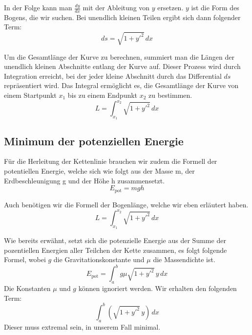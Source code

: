In der Folge kann man \(\frac{dy}{dx}\) mit der Ableitung von \(y\) ersetzen.
\(y\) ist die Form des Bogens, die wir suchen.
Bei unendlich kleinen Teilen ergibt sich dann folgender Term:
\begin{equation}
	ds
	=
	\sqrt{1 + y'^2} \, dx
\end{equation}

Um die Gesamtlänge der Kurve zu berechnen, summiert man die Längen der unendlich kleinen Abschnitte entlang der Kurve auf.
Dieser Prozess wird durch Integration erreicht, bei der jeder kleine Abschnitt durch das Differential \(ds\) repräsentiert wird.
Das Integral ermöglicht es, die Gesamtlänge der Kurve von einem Startpunkt \(x_1\) bis zu einem Endpunkt \(x_2\) zu bestimmen.
\begin{equation}
	L
	=
	\int_{x_1}^{x_2} \sqrt{1 + y'^2} \, dx
\end{equation}

\subsection{Minimum der potenziellen Energie
\label{kettenlinie:subsection:Minimum der potenziellen Energie}}
Für die Herleitung der Kettenlinie brauchen wir zudem die Formell der potentiellen Energie, welche sich wie folgt aus der Masse m, der Erdbeschleunigung g und der Höhe h zusammensetzt.
\begin{equation}
	E_{\text{pot}}
	=
	mgh
\end{equation}

Auch benötigen wir die Formell der Bogenlänge, welche wir eben erläutert haben.
\begin{equation}
	L
	=
	\int_{x_1}^{x_2} \sqrt{1 + y'^2} \, dx
\end{equation}

Wie bereits erwähnt, setzt sich die potenzielle Energie aus der Summe der pozentiellen Energien aller Teilchen der Kette zusammen, es folgt folgende Formel, wobei \(g\) die Gravitationskonstante und \(\mu\) die Massendichte ist.
\begin{equation}
	E_{\text{pot}}
	=
	\int_{a}^{b} g \mu \sqrt{1 + y'^2} \, y \, dx
\end{equation}
Die Konstanten \(\mu\) und \(g\) können ignoriert werden.
Wir erhalten den folgenden Term:
\begin{equation}
	\int_{a}^{b} (\sqrt{1 + y'^2} \, y) \, dx
\end{equation}
Dieser muss extremal sein, in unserem Fall minimal.

